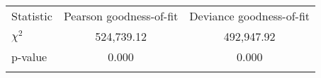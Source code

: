 \begin{center}
\begin{tabular}{lcc}
\hline \noalign{\smallskip}Statistic & Pearson goodness-of-fit & Deviance goodness-of-fit\\
\noalign{\smallskip}\hline \noalign{\smallskip}$\chi^2$ & 524,739.12 & 492,947.92\\
p-value & 0.000 & 0.000\\
\noalign{\smallskip}\hline\end{tabular}\\
\end{center}
